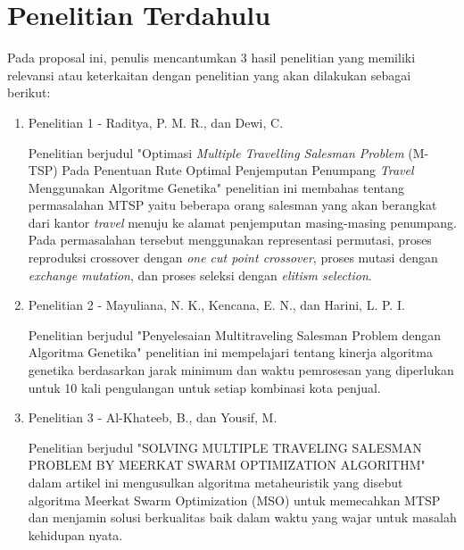 \section{Penelitian Terdahulu}

Pada proposal ini, penulis mencantumkan 3 hasil penelitian yang memiliki relevansi atau keterkaitan dengan penelitian yang akan dilakukan sebagai berikut:

\begin{enumerate}
	\item Penelitian 1 - Raditya, P. M. R., dan Dewi, C. \cite{raditya2017optimasi}

Penelitian berjudul "Optimasi \textit{Multiple Travelling Salesman Problem} (M-TSP) Pada Penentuan Rute Optimal Penjemputan Penumpang \textit{Travel} Menggunakan Algoritme Genetika" penelitian ini membahas tentang permasalahan MTSP yaitu beberapa orang salesman yang akan berangkat dari kantor \textit{travel} menuju ke alamat penjemputan masing-masing penumpang. Pada permasalahan tersebut menggunakan representasi permutasi, proses reproduksi crossover dengan \textit{one cut point crossover}, proses mutasi dengan \textit{exchange mutation}, dan proses seleksi dengan \textit{elitism selection}.

	\item Penelitian 2 - Mayuliana, N. K., Kencana, E. N., dan Harini, L. P. I. \cite{mayuliana2015penyelesaian}

Penelitian berjudul "Penyelesaian Multitraveling Salesman Problem dengan Algoritma Genetika" penelitian ini mempelajari tentang kinerja algoritma genetika berdasarkan jarak minimum dan waktu pemrosesan yang diperlukan untuk 10 kali pengulangan untuk setiap kombinasi kota penjual.

	\item Penelitian 3 - Al-Khateeb, B., dan Yousif, M. \cite{al2019solving}

Penelitian berjudul "SOLVING MULTIPLE TRAVELING SALESMAN PROBLEM BY MEERKAT SWARM OPTIMIZATION ALGORITHM" dalam artikel ini mengusulkan algoritma metaheuristik yang disebut algoritma Meerkat Swarm Optimization (MSO) untuk memecahkan MTSP dan menjamin solusi berkualitas baik dalam waktu yang wajar untuk masalah kehidupan nyata.

\end{enumerate}




